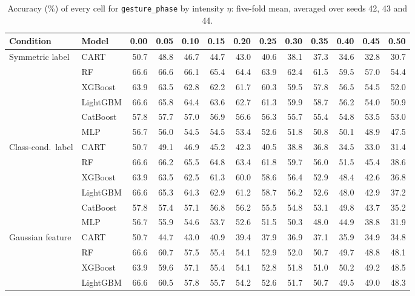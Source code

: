 \begin{table}[p]
\centering
\tiny
\setlength{\tabcolsep}{2.6pt}
\caption{Accuracy (\%) of every cell for \texttt{gesture\_phase} by intensity $\eta$: five-fold mean, averaged over seeds 42, 43 and 44.}
\label{tab:grid_gesture_phase}
\begin{tabular}{@{}llrrrrrrrrrrr@{}}
\toprule
Condition & Model & 0.00 & 0.05 & 0.10 & 0.15 & 0.20 & 0.25 & 0.30 & 0.35 & 0.40 & 0.45 & 0.50 \\
\midrule
Symmetric label & CART & 50.7 & 48.8 & 46.7 & 44.7 & 43.0 & 40.6 & 38.1 & 37.3 & 34.6 & 32.8 & 30.7 \\
 & RF & 66.6 & 66.6 & 66.1 & 65.4 & 64.4 & 63.9 & 62.4 & 61.5 & 59.5 & 57.0 & 54.4 \\
 & XGBoost & 63.9 & 63.5 & 62.8 & 62.2 & 61.7 & 60.3 & 59.5 & 57.8 & 56.5 & 54.5 & 52.0 \\
 & LightGBM & 66.6 & 65.8 & 64.4 & 63.6 & 62.7 & 61.3 & 59.9 & 58.7 & 56.2 & 54.0 & 50.9 \\
 & CatBoost & 57.8 & 57.7 & 57.0 & 56.9 & 56.6 & 56.3 & 55.7 & 55.4 & 54.8 & 53.5 & 53.0 \\
 & MLP & 56.7 & 56.0 & 54.5 & 54.5 & 53.4 & 52.6 & 51.8 & 50.8 & 50.1 & 48.9 & 47.5 \\
\midrule
Class-cond.\ label & CART & 50.7 & 49.1 & 46.9 & 45.2 & 42.3 & 40.5 & 38.8 & 36.8 & 34.5 & 33.0 & 31.4 \\
 & RF & 66.6 & 66.2 & 65.5 & 64.8 & 63.4 & 61.8 & 59.7 & 56.0 & 51.5 & 45.4 & 38.6 \\
 & XGBoost & 63.9 & 63.5 & 62.5 & 61.3 & 60.0 & 58.6 & 56.4 & 52.9 & 48.4 & 42.6 & 36.8 \\
 & LightGBM & 66.6 & 65.3 & 64.3 & 62.9 & 61.2 & 58.7 & 56.2 & 52.6 & 48.0 & 42.9 & 37.2 \\
 & CatBoost & 57.8 & 57.4 & 57.1 & 56.8 & 56.2 & 55.5 & 54.8 & 53.1 & 49.8 & 43.7 & 35.2 \\
 & MLP & 56.7 & 55.9 & 54.6 & 53.7 & 52.6 & 51.5 & 50.3 & 48.0 & 44.9 & 38.8 & 31.9 \\
\midrule
Gaussian feature & CART & 50.7 & 44.7 & 43.0 & 40.9 & 39.4 & 37.9 & 36.9 & 37.1 & 35.9 & 34.9 & 34.8 \\
 & RF & 66.6 & 60.7 & 57.5 & 55.4 & 54.1 & 52.9 & 52.0 & 50.7 & 49.7 & 48.8 & 48.1 \\
 & XGBoost & 63.9 & 59.6 & 57.1 & 55.4 & 54.1 & 52.8 & 51.8 & 51.0 & 50.2 & 49.2 & 48.5 \\
 & LightGBM & 66.6 & 60.5 & 57.8 & 55.7 & 54.2 & 52.6 & 51.7 & 50.7 & 49.5 & 49.0 & 48.3 \\

\end{tabular}
\end{table}
